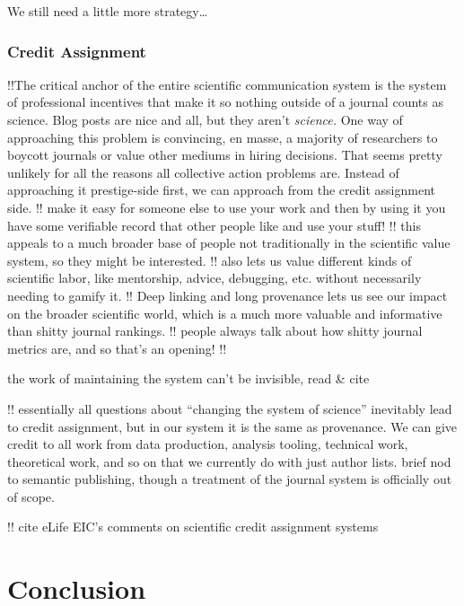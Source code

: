 \documentclass[notoc]{tufte-book}
\begin{document}
We still need a little more strategy\ldots{}






\subsection{Credit Assignment}



 !!The critical anchor of the entire scientific
communication system is the system of professional incentives that make
it so nothing outside of a journal counts as science. Blog posts are
nice and all, but they aren't \emph{science.} One way of approaching
this problem is convincing, en masse, a majority of researchers to
boycott journals or value other mediums in hiring decisions. That seems
pretty unlikely for all the reasons all collective action problems are.
Instead of approaching it prestige-side first, we can approach from the
credit assignment side. !! make it easy for someone else to use your
work and then by using it you have some verifiable record that other
people like and use your stuff! !! this appeals to a much broader base
of people not traditionally in the scientific value system, so they
might be interested. !! also lets us value different kinds of scientific
labor, like mentorship, advice, debugging, etc. without necessarily
needing to gamify it. !! Deep linking and long provenance lets us see
our impact on the broader scientific world, which is a much more
valuable and informative than shitty journal rankings. !! people always
talk about how shitty journal metrics are, and so that's an opening! !!

the work of maintaining the system can't be invisible, read \& cite \citep{classeDistributedInfrastructureSupport2017, bowkerInformationInfrastructureStudies2010} 

!! essentially all questions about ``changing the system of science''
inevitably lead to credit assignment, but in our system it is the same
as provenance. We can give credit to all work from data production,
analysis tooling, technical work, theoretical work, and so on that we
currently do with just author lists. brief nod to semantic publishing,
though a treatment of the journal system is officially out of scope.

!! cite eLife EIC's comments on scientific credit assignment systems






\chapter{Conclusion}
\end{document}
